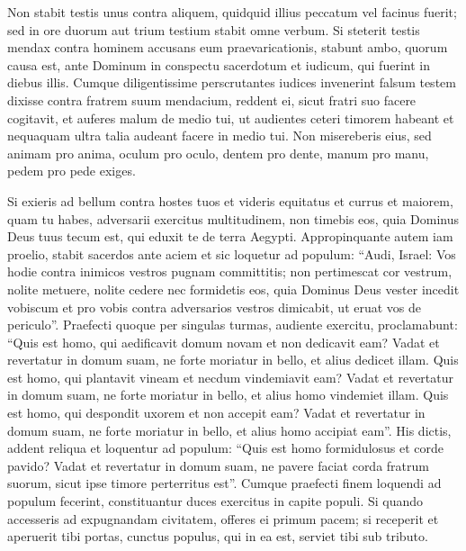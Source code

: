 \begin{biblechapter}
\begin{biblechapter}
\begin{biblechapter}
\begin{biblechapter}
\begin{biblechapter}
\begin{biblechapter}
\begin{biblechapter}
\begin{biblechapter}
\begin{biblechapter}
\begin{biblechapter}
\begin{biblechapter}
\begin{biblechapter}
\begin{biblechapter}
\begin{biblechapter}
\begin{biblechapter}
\begin{biblechapter}
\begin{biblechapter}
\begin{biblechapter}
\begin{biblechapter}
 \verse Non stabit testis unus contra aliquem, quidquid illius peccatum vel facinus fuerit; sed in ore duorum aut trium testium stabit omne verbum. 
\verse Si steterit testis mendax contra hominem accusans eum praevaricationis, 
\verse stabunt ambo, quorum causa est, ante Dominum in conspectu sacerdotum et iudicum, qui fuerint in diebus illis. 
\verse Cumque diligentissime perscrutantes iudices invenerint falsum testem dixisse contra fratrem suum mendacium, 
\verse reddent ei, sicut fratri suo facere cogitavit, et auferes malum de medio tui, 
\verse ut audientes ceteri timorem habeant et nequaquam ultra talia audeant facere in medio tui. 
\verse Non misereberis eius, sed animam pro anima, oculum pro oculo, dentem pro dente, manum pro manu, pedem pro pede exiges.
 
\begin{biblechapter}
\verse Si exieris ad bellum contra hostes tuos et videris equitatus et currus et maiorem, quam tu habes, adversarii exercitus multitudinem, non timebis eos, quia Dominus Deus tuus tecum est, qui eduxit te de terra Aegypti. 
\verse Appropinquante autem iam proelio, stabit sacerdos ante aciem et sic loquetur ad populum: 
\verse “Audi, Israel: Vos hodie contra inimicos vestros pugnam committitis; non pertimescat cor vestrum, nolite metuere, nolite cedere nec formidetis eos, 
\verse quia Dominus Deus vester incedit vobiscum et pro vobis contra adversarios vestros dimicabit, ut eruat vos de periculo”.
 \verse Praefecti quoque per singulas turmas, audiente exercitu, proclamabunt: “Quis est homo, qui aedificavit domum novam et non dedicavit eam? Vadat et revertatur in domum suam, ne forte moriatur in bello, et alius dedicet illam. 
\verse Quis est homo, qui plantavit vineam et necdum vindemiavit eam? Vadat et revertatur in domum suam, ne forte moriatur in bello, et alius homo vindemiet illam. 
\verse Quis est homo, qui despondit uxorem et non accepit eam? Vadat et revertatur in domum suam, ne forte moriatur in bello, et alius homo accipiat eam”. 
\verse His dictis, addent reliqua et loquentur ad populum: “Quis est homo formidulosus et corde pavido? Vadat et revertatur in domum suam, ne pavere faciat corda fratrum suorum, sicut ipse timore perterritus est”. 
\verse Cumque praefecti finem loquendi ad populum fecerint, constituantur duces exercitus in capite populi.
 \verse Si quando accesseris ad expugnandam civitatem, offeres ei primum pacem; 
 \verse si receperit et aperuerit tibi portas, cunctus populus, qui in ea est, serviet tibi sub tributo. 

\end{biblechapter}
\end{biblechapter}
\end{biblechapter}
\end{biblechapter}
\end{biblechapter}
\end{biblechapter}
\end{biblechapter}
\end{biblechapter}
\end{biblechapter}
\end{biblechapter}
\end{biblechapter}
\end{biblechapter}
\end{biblechapter}
\end{biblechapter}
\end{biblechapter}
\end{biblechapter}
\end{biblechapter}
\end{biblechapter}
\end{biblechapter}
\end{biblechapter}
